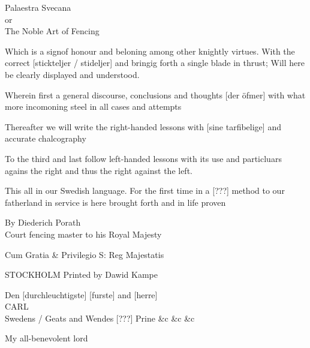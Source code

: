 \cleartoleftpage


\newpage

Palaestra Svecana \\
or \\
The Noble Art of Fencing

Which is a signof honour and beloning among other knightly virtues. With the correct [stickteljer / stideljer] and bringig forth a single blade in thrust; Will here be clearly displayed and understood.

Wherein first a general discourse, conclusions and thoughts [der öfmer] with what more incomoning steel in all cases and attempts

Thereafter we will write the right-handed lessons with [sine tarfibelige] and accurate chalcography

To the third and last follow left-handed lessons with its use and particluars agains the right and thus the right against the left.

This all in our Swedish language. For the first time in a [???] method to our fatherland in service is here brought forth and in life proven

By Diederich Porath \\
Court fencing master to his Royal Majesty

Cum Gratia \& Privilegio S: Reg Majestatis

STOCKHOLM Printed by Dawid Kampe

\newpage 


\newpage

Den [durchleuchtigste] [furste] and [herre] \\
CARL \\
Swedens / Geats and Wendes [???] Prine \&c \&c \&c

My all-benevolent lord
